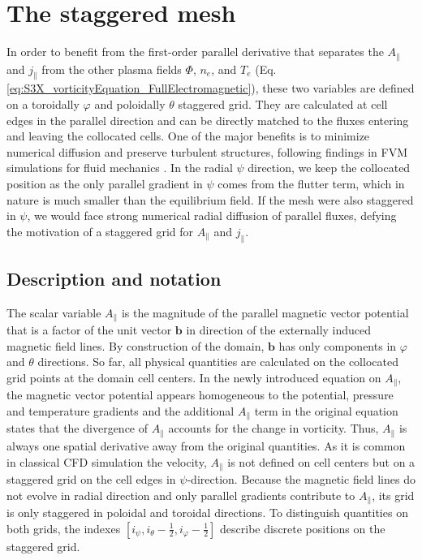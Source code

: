 \section{The staggered mesh}
\label{sec:impl_staggeredMesh}

In order to benefit from the first-order parallel derivative that separates the $A_\parallel$ and $j_\parallel$ from the other plasma fields $\Phi$, $n_e$, and $T_e$ (Eq. \ref{eq:S3X_vorticityEquation_FullElectromagnetic}), these two variables are defined on a toroidally $\varphi$ and poloidally $\theta$ staggered grid. They are calculated at cell edges in the parallel direction and can be directly matched to the fluxes entering and leaving the collocated cells. One of the major benefits is to minimize numerical diffusion and preserve turbulent structures, following findings in FVM simulations for fluid mechanics \cite{meier1999comparison}. In the radial $\psi$ direction, we keep the collocated position as the only parallel gradient in $\psi$ comes from the flutter term, which in nature is much smaller than the equilibrium field. If the mesh were also staggered in $\psi$, we would face strong numerical radial diffusion of parallel fluxes, defying the motivation of a staggered grid for $A_\parallel$ and $j_\parallel$. \newline



\subsection{Description and notation}
The scalar variable $A_\parallel$ is the magnitude of the parallel magnetic vector potential that is a factor of the unit vector $\mathbf{b}$ in direction of the externally induced magnetic field lines. By construction of the domain, $\mathbf{b}$ has only components in $\varphi$ and $\theta$ directions. So far, all physical quantities are calculated on the collocated grid points at the domain cell centers. In the newly introduced equation on $A_\parallel$, the magnetic vector potential appears homogeneous to the potential, pressure and temperature gradients and the additional $A_\parallel$ term in the original equation states that the divergence of $A_\parallel$ accounts for the change in vorticity. Thus, $A_\parallel$ is always one spatial derivative away from the original quantities. As it is common in classical CFD simulation the velocity, $A_\parallel$ is not defined on cell centers but on a staggered grid on the cell edges in $\psi$-direction. Because the magnetic field lines do not evolve in radial direction and only parallel gradients contribute to $A_\parallel$, its grid is only staggered in  poloidal and toroidal directions. To distinguish quantities on both grids, the indexes $[i_\psi, i_\theta - \frac{1}{2},i_\varphi-\frac{1}{2}]$ describe discrete positions on the staggered grid. \\

